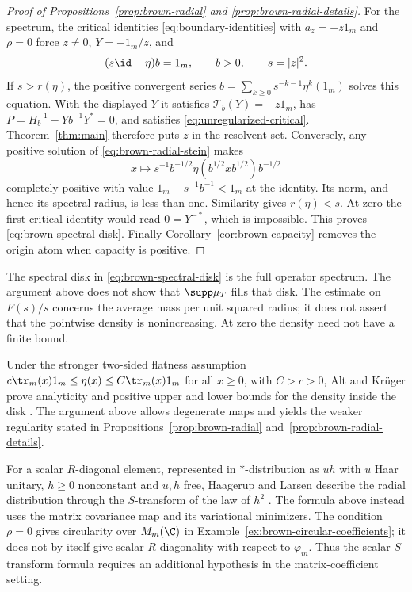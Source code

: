 \begin{proof}[Proof of Propositions~\ref{prop:brown-radial} and
\ref{prop:brown-radial-details}]
For the spectrum, the critical identities \eqref{eq:boundary-identities} with $a_z=-z1_m$ and $\rho=0$ force $z\ne0$, $Y=-1_m/\overline z$, and
\begin{equation}\label{eq:brown-radial-stein}
 (s\id-\eta)b=1_m,\qquad b>0,\qquad s=|z|^2.
\end{equation}
If $s>r(\eta)$, the positive convergent series $b=\sum_{k\ge0}s^{-k-1}\eta^k(1_m)$ solves this equation.
With the displayed $Y$ it satisfies $\mathcal T_b(Y)=-z1_m$, has $P=H_b^{-1}-Yb^{-1}Y^*=0$, and satisfies \eqref{eq:unregularized-critical}.
Theorem~\ref{thm:main} therefore puts $z$ in the resolvent set.
Conversely, any positive solution of \eqref{eq:brown-radial-stein} makes
\[
 x\longmapsto s^{-1}b^{-1/2}\eta(b^{1/2}xb^{1/2})b^{-1/2}
\]
completely positive with value $1_m-s^{-1}b^{-1}<1_m$ at the identity.
Its norm, and hence its spectral radius, is less than one.
Similarity gives $r(\eta)<s$.
At zero the first critical identity would read $0=Y^{-*}$, which is impossible.
This proves \eqref{eq:brown-spectral-disk}.
Finally Corollary~\ref{cor:brown-capacity} removes the origin atom when capacity is positive.
\end{proof}

The spectral disk in \eqref{eq:brown-spectral-disk} is the full operator spectrum.
The argument above does not show that $\supp\mu_T$ fills that disk.
The estimate on $F(s)/s$ concerns the average mass per unit squared radius; it does not assert that the pointwise density is nonincreasing.
At zero the density need not have a finite bound.

Under the stronger two-sided flatness assumption $c\tr_m(x)1_m\le\eta(x)\le C\tr_m(x)1_m$ for all $x\ge0$, with $C>c>0$, Alt and Kr\"uger prove analyticity and positive upper and lower bounds for the density inside the disk \cite[Proposition~2.9 and Theorem~2.5]{AK20}.
The argument above allows degenerate maps and yields the weaker regularity stated in Propositions~\ref{prop:brown-radial} and~\ref{prop:brown-radial-details}.

\begin{remark}
\label{rem:brown-scalar-r-diagonal}
For a scalar $R$-diagonal element, represented in $*$-distribution as $uh$ with $u$ Haar unitary, $h\ge0$ nonconstant and $u,h$ free, Haagerup and Larsen describe the radial distribution through the $S$-transform of the law of $h^2$ \cite[author preprint, Theorem~4.4]{HL00}.
The formula above instead uses the matrix covariance map and its variational minimizers.
The condition $\rho=0$ gives circularity over $M_m(\C)$ in Example~\ref{ex:brown-circular-coefficients}; it does not by itself give scalar $R$-diagonality with respect to $\varphi_m$.
Thus the scalar $S$-transform formula requires an additional hypothesis in the matrix-coefficient setting.
\end{remark}

